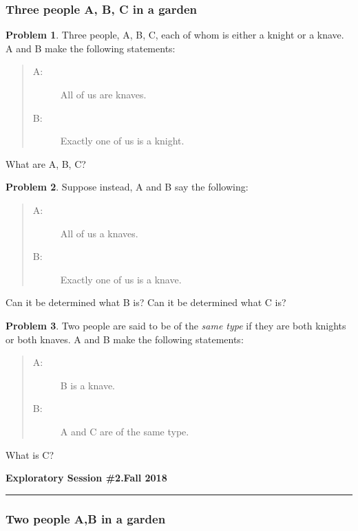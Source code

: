 \documentclass[11pt]{article}
\theoremstyle{definition}
\newtheorem{problem}{Problem}
\begin{document}
\subsubsection*{Three people A, B, C in a garden}

\begin{problem}
  Three people, A, B, C, each of whom is either a knight or a knave.  A and B make the following statements:
  \begin{quote}
    \begin{description}
    \item[A:] All of us are knaves.
    \item[B:] Exactly one of us is a knight.
    \end{description}
  \end{quote}
  What are A, B, C?
\end{problem}

\begin{problem}
  Suppose instead, A and B say the following:
  \begin{quote}
    \begin{description}
    \item[A:] All of us a knaves.
    \item[B:] Exactly one of us is a knave.
    \end{description}
  \end{quote}
  Can it be determined what B is?  Can it be determined what C is?
\end{problem}

\begin{problem}
  Two people are said to be of the \emph{same type} if they are both knights or both knaves.  A and B make the following
  statements:
  \begin{quote}
    \begin{description}
    \item[A:] B is a knave.
    \item[B:] A and C are of the same type.
    \end{description}
  \end{quote}
  What is C?
\end{problem}
\newpage

\hfill{\large\bf Exploratory Session \#2.}\hfill{\large\bf  Fall 2018}\hrule

\subsubsection*{Two people A,B in a garden}
\end{document}
